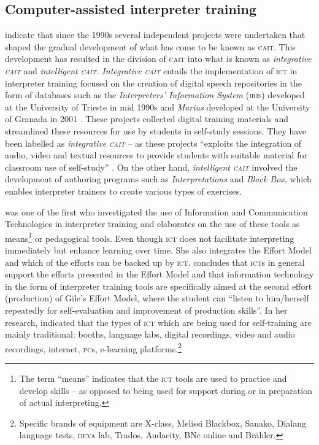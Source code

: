 \documentclass[output=paper]{langsci/langscibook}
\begin{document}
\subsection{Computer-assisted interpreter training}
\citet{Sandrelli2007a} indicate that since the 1990s several independent projects were undertaken that shaped the gradual development of what has come to be known as \textsc{cait}. This development has resulted in the division of \textsc{cait} into what is known as \textit{integrative \textsc{cait}} and \textit{intelligent \textsc{cait}.} \textit{Integrative \textsc{cait}} entails the  implementation of \textsc{ict} in interpreter training focused on the creation of digital speech repositories in the form of databases such as the \textit{Interpreters’ Information System} (\textsc{iris}) developed at the University of Trieste in mid 1990s \citep{Carabelli1997} and \textit{Marius} developed at the University of Granada in 2001 \citep{Pöchhacker1994}. These projects collected digital training materials and streamlined these resources for use by students in self-study sessions. They have been labelled as \textit{integrative \textsc{cait}} – as these projects “exploits the integration of audio, video and textual resources to provide students with suitable material for classroom use of self-study” \citep[277]{Sandrelli2007a}. On the other hand, \textit{intelligent \textsc{cait}} involved the development of authoring programs such as \textit{Interpretations} and \textit{Black Box}, which enables interpreter trainers to create various types of exercises. 

\citet[229]{Berber2010} was one of the first who investigated the use of Information and Communication Technologies in interpreter training and elaborates on the use of these tools as means\footnote{The term “means” indicates that the \textsc{ict} tools are used to practice and develop skills -- as opposed to being used for support during or in preparation of actual interpreting.} or pedagogical tools. Even though \textsc{ict} does not facilitate interpreting immediately but enhance learning over time. She also integrates the Effort Model \citep{Gile1995} and which of the efforts can be backed up by \textsc{ict}. \citet[237]{Berber2010} concludes that \textsc{ict}s in general support the efforts presented in the Effort Model and that information technology in the form of interpreter training tools are specifically aimed at the second effort (production) of Gile’s Effort Model, where the student can “listen to him/herself repeatedly for self-evaluation and improvement of production skills”. In her research, \citet[243]{Berber2010} indicated that the types of \textsc{ict} which are being used for self-training are mainly traditional: booths, language labs, digital recordings, video and audio recordings, internet, \textsc{pc}s, e-learning platforms.\footnote{Specific brands of equipment are X-class, Melissi Blackbox, Sanako, Dialang language tests, \textsc{deya} lab, Trados, Audacity, BNc online and Brähler.}
\end{document}
